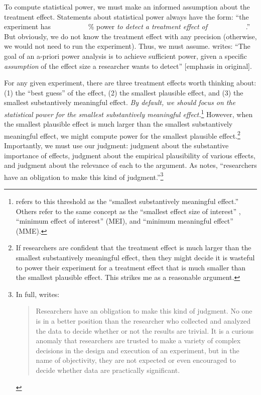 \documentclass[12pt]{article}
\makeatletter
\def\pr@blank{~~~~~}
\DeclareRobustCommand{\underline}[1]{\def\pr@arg{#1}%
  \ifx\pr@arg\pr@blank\pr@underline{\hbox to 1.3\dimexpr\f@size pt\relax{}}\else\pr@underline{#1}\fi}
\makeatother
\begin{document}
To compute statistical power, we must make an informed assumption about the treatment effect.
Statements about statistical power always have the form: ``the experiment has \underline{~~~~~}\% power \emph{to detect a treatment effect of \underline{~~~~~}}.''
But obviously, we do not know the treatment effect with any precision (otherwise, we would not need to run the experiment). Thus, we must assume.
\citet[6]{Lakens2022} writes: ``The goal of an a-priori power analysis is to achieve sufficient power, given a specific \emph{assumption} of the effect size a researcher wants to detect'' [emphasis in original].

For any given experiment, there are three treatment effects worth thinking about: (1) the ``best guess'' of the effect, (2) the smallest plausible effect, and (3) the smallest substantively meaningful effect.
\emph{By default, we should focus on the statistical power for the smallest substantively meaningful effect.}\footnote{
  \citet{Rainey2014} refers to this threshold as the ``smallest substantively meaningful effect.''
  Others refer to the same concept as the ``smallest effect size of interest'' \citep[SESOI;][]{Lakens2018}, ``minimum effect of interest'' (MEI), and ``minimum meaningful effect'' (MME).
  }
However, when the smallest plausible effect is much larger than the smallest substantively meaningful effect, we might compute power for the smallest plausible effect.\footnote{
  If researchers are confident that the treatment effect is much larger than the smallest substantively meaningful effect, then they might decide it is wasteful to power their experiment for a treatment effect that is much smaller than the smallest plausible effect.
  This strikes me as a reasonable argument.
  }
Importantly, we must use our judgment: judgment about the substantive importance of effects, judgment about the empirical plausibility of various effects, and judgment about the relevance of each to the argument.
As \citet[755]{Kirk1996} notes, ``researchers have an obligation to make this kind of judgment.''\footnote{
In full, \citet[755]{Kirk1996} writes:
\begin{quote}
  Researchers have an obligation to make this kind of judgment.
  No one is in a better position than the researcher who collected and analyzed the data to decide whether or not the results are trivial.
  It is a curious anomaly that researchers are trusted to make a variety of complex decisions in the design and execution of an experiment, but in the name of objectivity, they are not expected or even encouraged to decide whether data are practically significant.
\end{quote}
}
\end{document}
